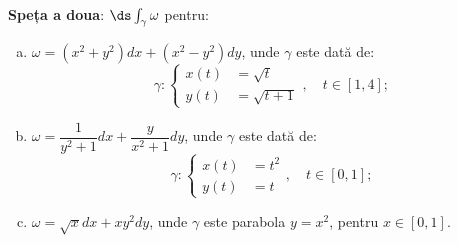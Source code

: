 \textbf{Speța a doua}: $ \ds\int_\gamma \omega $ pentru:

\begin{enumerate}[(a)]
    \item $ \omega = (x^2 + y^2) dx + (x^2 - y^2) dy $, unde $ \gamma $ este
        dată de:
        \[
            \gamma: %
            \begin{cases}
                x(t) &= \sqrt{t} \\
                y(t) &= \sqrt{t + 1}
            \end{cases}, \quad t \in [1, 4];
        \]
    \item $ \omega = \dfrac{1}{y^2 + 1} dx + \dfrac{y}{x^2 + 1} dy $, unde
        $ \gamma $ este dată de:
        \[
              \gamma: %
              \begin{cases}
                  x(t) &= t^2 \\
                  y(t) &= t
              \end{cases}, \quad t \in [0, 1];
        \]
    \item $ \omega = \sqrt{x} dx + xy^2 dy $, unde $ \gamma $ este
        parabola $ y = x^2 $, pentru $ x \in [0, 1] $.
\end{enumerate}

